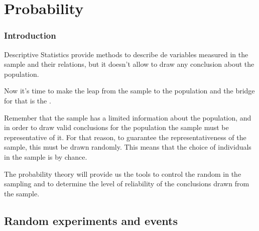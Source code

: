 \section{Probability}



\begin{frame}
\frametitle{Introduction}
Descriptive Statistics provide methods to describe de variables measured in the sample and their relations, but it
doesn't allow to draw any conclusion about the population.

Now it's time to make the leap from the sample to the population and the bridge for that is the
.

Remember that the sample has a limited information about the population, and in order to draw valid conclusions for the
population the sample must be representative of it.
For that reason, to guarantee the representativeness of the sample, this must be drawn randomly. 
This means that the choice of individuals in the sample is by chance. 

The probability theory will provide us the tools to control the random in the sampling and to determine the level of
reliability of the conclusions drawn from the sample. 
\end{frame}


\subsection{Random experiments and events}

